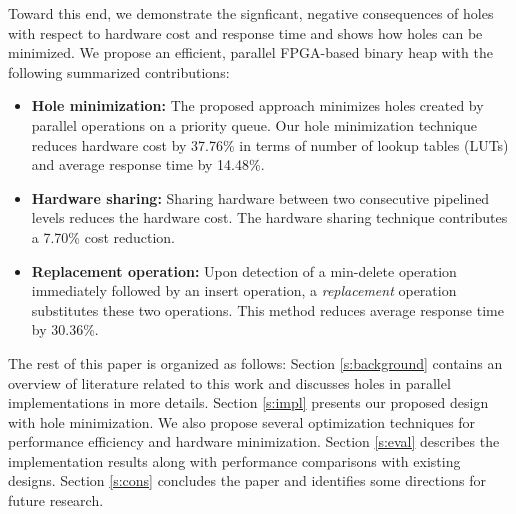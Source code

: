 Toward this end, we demonstrate the signficant, negative consequences of holes with respect to hardware cost and response time and shows how holes can be minimized.
We propose an efficient, parallel FPGA-based binary heap with the following summarized contributions: 
\begin{itemize}
\item {\bf Hole minimization:} The proposed approach minimizes holes created by parallel operations on a priority queue. Our hole minimization technique reduces hardware cost by 37.76\% in terms of number of lookup tables (LUTs) and average response time by 14.48\%.
\item {\bf Hardware sharing:} Sharing hardware between two consecutive pipelined levels reduces the hardware cost. The hardware sharing technique contributes a 7.70\% cost reduction.
\item {\bf Replacement operation:} Upon detection of a min-delete operation immediately followed by an insert operation, a {\it replacement} operation substitutes these two operations. This method reduces average response time by 30.36\%.
\end{itemize}

The rest of this paper is organized as follows:
Section \autoref{s:background} contains an overview of literature related to this work and discusses holes in parallel implementations in more details.
Section \autoref{s:impl} presents our proposed design with hole minimization. 
We also propose several optimization techniques for performance efficiency and hardware minimization.
Section \autoref{s:eval} describes the implementation results along with performance comparisons with existing designs.
Section \autoref{s:cons} concludes the paper and identifies some directions for future research.
